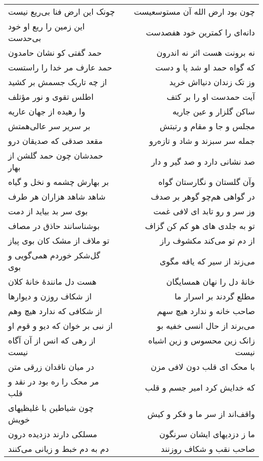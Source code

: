 \begin{center}
\begin{longtable}{l p{0.5cm} r}
\\
چونک این ارض فنا بی‌ریع نیست
&&
چون بود ارض الله آن مستوسعیست
\\
این زمین را ریع او خود بی‌حدست
&&
دانه‌ای را کمترین خود هفصدست
\\
حمد گفتی کو نشان حامدون
&&
نه برونت هست اثر نه اندرون
\\
حمد عارف مر خدا را راستست
&&
که گواه حمد او شد پا و دست
\\
از چه تاریک جسمش بر کشید
&&
وز تک زندان دنیااش خرید
\\
اطلس تقوی و نور مؤتلف
&&
آیت حمدست او را بر کتف
\\
وا رهیده از جهان عاریه
&&
ساکن گلزار و عین جاریه
\\
بر سریر سر عالی‌همتش
&&
مجلس و جا و مقام و رتبتش
\\
مقعد صدقی که صدیقان درو
&&
جمله سر سبزند و شاد و تازه‌رو
\\
حمدشان چون حمد گلشن از بهار
&&
صد نشانی دارد و صد گیر و دار
\\
بر بهارش چشمه و نخل و گیاه
&&
وآن گلستان و نگارستان گواه
\\
شاهد شاهد هزاران هر طرف
&&
در گواهی هم‌چو گوهر بر صدف
\\
بوی سر بد بیاید از دمت
&&
وز سر و رو تابد ای لافی غمت
\\
بوشناسانند حاذق در مصاف
&&
تو به جلدی های هو کم کن گزاف
\\
تو ملاف از مشک کان بوی پیاز
&&
از دم تو می‌کند مکشوف راز
\\
گل‌شکر خوردم همی‌گویی و بوی
&&
می‌زند از سیر که یافه مگوی
\\
هست دل مانندهٔ خانهٔ کلان
&&
خانهٔ دل را نهان همسایگان
\\
از شکاف روزن و دیوارها
&&
مطلع گردند بر اسرار ما
\\
از شکافی که ندارد هیچ وهم
&&
صاحب خانه و ندارد هیچ سهم
\\
از نبی بر خوان که دیو و قوم او
&&
می‌برند از حال انسی خفیه بو
\\
از رهی که انس از آن آگاه نیست
&&
زانک زین محسوس و زین اشباه نیست
\\
در میان ناقدان زرقی متن
&&
با محک ای قلب دون لافی مزن
\\
مر محک را ره بود در نقد و قلب
&&
که خدایش کرد امیر جسم و قلب
\\
چون شیاطین با غلیظیهای خویش
&&
واقف‌اند از سر ما و فکر و کیش
\\
مسلکی دارند دزدیده درون
&&
ما ز دزدیهای ایشان سرنگون
\\
دم به دم خبط و زیانی می‌کنند
&&
صاحب نقب و شکاف روزنند
\\

\end{longtable}
\end{center}
